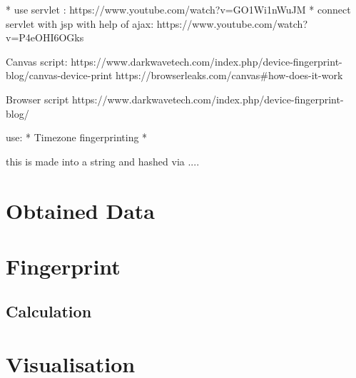 * use servlet : https://www.youtube.com/watch?v=GO1Wi1nWuJM
* connect servlet with jsp with help of ajax: https://www.youtube.com/watch?v=P4eOHI6OGks

Canvas script:
https://www.darkwavetech.com/index.php/device-fingerprint-blog/canvas-device-print
https://browserleaks.com/canvas#how-does-it-work

Browser script
https://www.darkwavetech.com/index.php/device-fingerprint-blog/

use: 
* Timezone fingerprinting
*

this is made into a string and hashed via ....
 

\section{Obtained Data}


\section{Fingerprint}

\subsection{Calculation}

\section{Visualisation}
